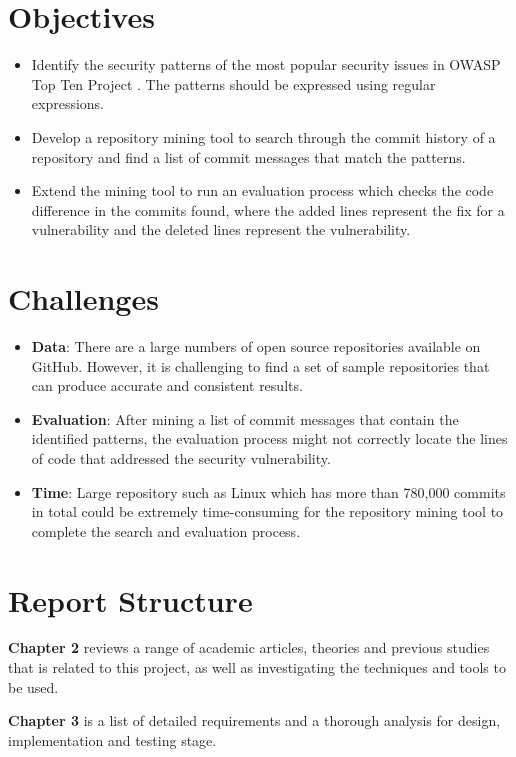 \documentclass[12pt, a4paper]{report}
\begin{document}
\section{Objectives}
\label{sec:objectives}
\begin{itemize}
	\item Identify the security patterns of the most popular security issues in OWASP Top Ten Project
	\cite{owasp_2017}. The patterns should be expressed using regular expressions.
	\item Develop a repository mining tool to search through the commit history of a repository and
	find a list of commit messages that match the patterns.
	\item Extend the mining tool to run an evaluation process which checks the code difference in the
	commits found, where the added lines represent the fix for a vulnerability and the deleted lines represent the vulnerability.
\end{itemize}

\section{Challenges}
\begin{itemize}
	\item \textbf{Data}: There are a large numbers of open source repositories available on GitHub.
	However, it is challenging to find a set of sample repositories that can produce accurate and
	consistent results.
	\item \textbf{Evaluation}: After mining a list of commit messages that contain the identified
	patterns, the evaluation process might not correctly locate the lines of code that addressed the
	security vulnerability.
	\item \textbf{Time}: Large repository such as Linux which has more than 780,000 commits in total
	\cite{linux_repo} could be extremely time-consuming for the repository mining tool to complete the
	search and evaluation process.
\end{itemize}

\section{Report Structure}
\textbf{Chapter 2} reviews a range of academic articles, theories and previous studies that
is related to this project, as well as investigating the techniques and tools to be used.

\noindent\textbf{Chapter 3} is a list of detailed requirements and a thorough analysis for design,
implementation and testing stage.
\end{document}
